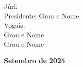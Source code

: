 \begin{titlepage}
	\noindent\hspace*{3.5cm}
	Júri:\\
	\noindent\hspace*{4.2cm}
	Presidente: Grau e Nome\\
	\noindent\hspace*{4.2cm}
	Vogais:\\
	\noindent\hspace*{5.5cm}
	Grau e Nome\\
	\noindent\hspace*{5.5cm}
	Grau e Nome\\
	
	\vfill
	\begin{center}
		\textbf{Setembro de 2025}
	\end{center}
\end{titlepage}

\thispagestyle{empty} %

